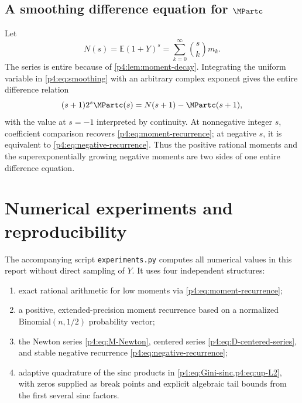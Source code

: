 \documentclass[11pt,oneside]{article}
\theoremstyle{definition}
\theoremstyle{remark}
\newcommand{\E}{\mathbb E}
\newcommand{\1}{\mathbf 1}
\begin{document}
\subsection{A smoothing difference equation for \texorpdfstring{\(\MPartc\)}{M}}

Let
\begin{equation}\label{p4:eq:Ndef}
 N(s)=\E(1+Y)^s
 =\sum_{k=0}^{\infty}\binom skm_k.
\end{equation}
The series is entire because of \cref{p4:lem:moment-decay}.  Integrating the uniform
variable in \cref{p4:eq:smoothing} with an arbitrary complex exponent gives the entire
difference relation
\begin{equation}\label{p4:eq:M-difference}
 (s+1)2^s\MPartc(s)=N(s+1)-\MPartc(s+1),
\end{equation}
with the value at \(s=-1\) interpreted by continuity.  At nonnegative integer \(s\),
coefficient comparison recovers \cref{p4:eq:moment-recurrence}; at negative \(s\), it is
equivalent to \cref{p4:eq:negative-recurrence}.  Thus the positive rational moments and
the superexponentially growing negative moments are two sides of one entire
difference equation.

\section{Numerical experiments and reproducibility}\label{p4:sec:numerics}

The accompanying script \texttt{experiments.py} computes all numerical values in this
report without direct sampling of \(Y\).  It uses four independent structures:
\begin{enumerate}
\item exact rational arithmetic for low moments via \cref{p4:eq:moment-recurrence};
\item a positive, extended-precision moment recurrence based on a normalized
\(\mathrm{Binomial}(n,1/2)\) probability vector;
\item the Newton series \cref{p4:eq:M-Newton}, centered series
\cref{p4:eq:D-centered-series}, and stable negative recurrence
\cref{p4:eq:negative-recurrence};
\item adaptive quadrature of the sinc products in \cref{p4:eq:Gini-sinc,p4:eq:up-L2}, with
zeros supplied as break points and explicit algebraic tail bounds from the first several
sinc factors.
\end{enumerate}
\end{document}
